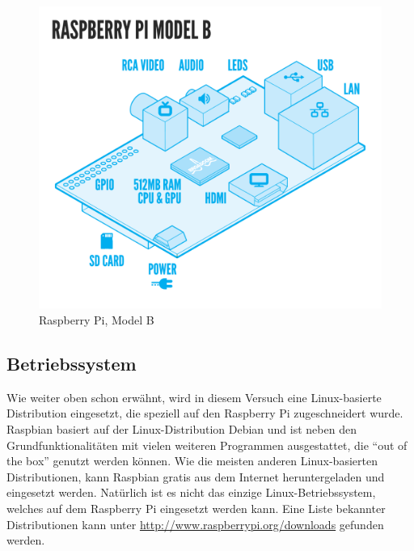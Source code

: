 \begin{figure}[h]
\centering
\includegraphics[scale=0.75]{images/RaspiModelB.png}
\caption{Raspberry Pi, Model B}
\end{figure}

\subsection{Betriebssystem}
Wie weiter oben schon erwähnt, wird in diesem Versuch eine Linux-basierte Distribution eingesetzt, die speziell auf den Raspberry Pi zugeschneidert wurde. Raspbian basiert auf der Linux-Distribution Debian und ist neben den Grundfunktionalitäten mit vielen weiteren Programmen ausgestattet, die ``out of the box'' genutzt werden können.
Wie die meisten anderen Linux-basierten Distributionen, kann Raspbian gratis aus dem Internet heruntergeladen und eingesetzt werden. Natürlich ist es nicht das einzige Linux-Betriebssystem, welches auf dem Raspberry Pi eingesetzt werden kann. Eine Liste bekannter Distributionen kann unter \url{http://www.raspberrypi.org/downloads} gefunden werden.